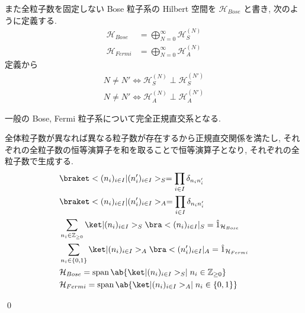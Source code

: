 \documentclass[uplatex,dvipdfmx,a4paper,11pt]{jlreq}
\makeatletter
\DeclareMathOperator{\Span}{span}
\newcommand{\ZZ}{\mathbb{Z}}
\newcommand{\HH}{\mathcal{H}}
\numberwithin{equation}{section}
\theoremstyle{definition}
\renewenvironment{proof}[1][\proofname]{\par
  \normalfont
  \topsep6\p@\@plus6\p@ \trivlist
  \item[\hskip\labelsep{\bfseries #1}\@addpunct{\bfseries}]\ignorespaces\quad\par
}{
  \qed\endtrivlist\@endpefalse
}
\renewcommand\proofname{証明}
\makeatother
\begin{document}
\begin{definition}
  また全粒子数を固定しない Bose 粒子系の Hilbert 空間を $\HH_{Bose}$ と書き, 次のように定義する.
  \begin{align}
    \HH_{Bose}  & = \bigoplus_{N=0}^\infty \HH_S^{(N)}     \\
    \HH_{Fermi} & = \bigoplus_{N = 0}^{\infty} \HH_A^{(N)}
  \end{align}
  定義から
  \begin{align}
    N \neq N' \iff \HH_S^{(N)}\perp\HH_S^{(N')} \\
    N\neq N' \iff \HH_A^{(N)}\perp\HH_A^{(N')}
  \end{align}
\end{definition}
\begin{theorem}
  一般の Bose, Fermi 粒子系について完全正規直交系となる.
\end{theorem}
\begin{proof}
  全体粒子数が異なれば異なる粒子数が存在するから正規直交関係を満たし, それぞれの全粒子数の恒等演算子を和を取ることで恒等演算子となり, それぞれの全粒子数で生成する.
  \begin{align}
     & \braket<(n_i)_{i\in I}|(n_i')_{i\in I}>_S = \prod_{i\in I}\delta_{n_in_i'}                   \\
     & \braket<(n_i)_{i\in I}|(n_i')_{i\in I}>_A = \prod_{i\in I}\delta_{n_in_i'}                   \\
     & \sum_{n_i\in\ZZ_{\geq 0}}\ket|(n_i)_{i\in I}>_S\bra<(n_i)_{i\in I}|_S = \hat{1}_{\HH_{Bose}} \\
     & \sum_{n_i\in\{0, 1\}} \ket|(n_i)_{i\in I}>_A\bra<(n_i')_{i\in I}|_A = \hat{1}_{\HH_{Fermi}}  \\
     & \HH_{Bose} = \Span\ab\{\ket|(n_i)_{i\in I}>_S \mid n_i\in\ZZ_{\geq 0} \}                     \\
     & \HH_{Fermi} = \Span\ab\{\ket|(n_i)_{i\in I}>_A \mid n_i\in\{0, 1\} \}
  \end{align}
\end{proof}
\end{document}
